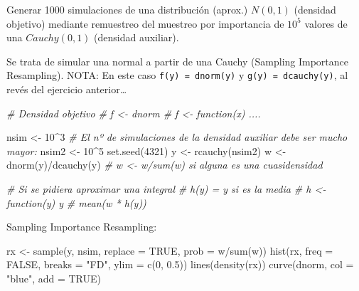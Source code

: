 \documentclass[
]{book}
\newenvironment{Shaded}{\begin{snugshade}}{\end{snugshade}}
\newcommand{\AttributeTok}[1]{\textcolor[rgb]{0.77,0.63,0.00}{#1}}
\newcommand{\CommentTok}[1]{\textcolor[rgb]{0.56,0.35,0.01}{\textit{#1}}}
\newcommand{\ConstantTok}[1]{\textcolor[rgb]{0.00,0.00,0.00}{#1}}
\newcommand{\DecValTok}[1]{\textcolor[rgb]{0.00,0.00,0.81}{#1}}
\newcommand{\FloatTok}[1]{\textcolor[rgb]{0.00,0.00,0.81}{#1}}
\newcommand{\FunctionTok}[1]{\textcolor[rgb]{0.00,0.00,0.00}{#1}}
\newcommand{\NormalTok}[1]{#1}
\newcommand{\OtherTok}[1]{\textcolor[rgb]{0.56,0.35,0.01}{#1}}
\newcommand{\SpecialCharTok}[1]{\textcolor[rgb]{0.00,0.00,0.00}{#1}}
\newcommand{\StringTok}[1]{\textcolor[rgb]{0.31,0.60,0.02}{#1}}
\theoremstyle{break}
\theoremstyle{definition}
\theoremstyle{definition}
\theoremstyle{definition}
\theoremstyle{definition}
\theoremstyle{remark}
\begin{document}
Generar 1000 simulaciones de una distribución (aprox.) \(N(0,1)\) (densidad objetivo) mediante remuestreo del muestreo por importancia de \(10^{5}\) valores de una \(Cauchy(0,1)\) (densidad auxiliar).

Se trata de simular una normal a partir de una Cauchy (Sampling Importance Resampling).
NOTA: En este caso \texttt{f(y)\ =\ dnorm(y)} y \texttt{g(y)\ =\ dcauchy(y)}, al revés del ejercicio anterior\ldots{}

\begin{Shaded}
\begin{Highlighting}[]
\CommentTok{\# Densidad objetivo}
\CommentTok{\# f \textless{}{-} dnorm \# f \textless{}{-} function(x) ....}

\NormalTok{nsim }\OtherTok{\textless{}{-}} \DecValTok{10}\SpecialCharTok{\^{}}\DecValTok{3}
\CommentTok{\# El nº de simulaciones de la densidad auxiliar debe ser mucho mayor:}
\NormalTok{nsim2 }\OtherTok{\textless{}{-}} \DecValTok{10}\SpecialCharTok{\^{}}\DecValTok{5}
\FunctionTok{set.seed}\NormalTok{(}\DecValTok{4321}\NormalTok{)}
\NormalTok{y }\OtherTok{\textless{}{-}} \FunctionTok{rcauchy}\NormalTok{(nsim2)}
\NormalTok{w }\OtherTok{\textless{}{-}} \FunctionTok{dnorm}\NormalTok{(y)}\SpecialCharTok{/}\FunctionTok{dcauchy}\NormalTok{(y) }\CommentTok{\# w \textless{}{-} w/sum(w) si alguna es una cuasidensidad}

\CommentTok{\# Si se pidiera aproximar una integral}
\CommentTok{\# h(y) = y si es la media \# h \textless{}{-} function(y) y}
\CommentTok{\# mean(w * h(y))}
\end{Highlighting}
\end{Shaded}

Sampling Importance Resampling:

\begin{Shaded}
\begin{Highlighting}[]
\NormalTok{rx }\OtherTok{\textless{}{-}} \FunctionTok{sample}\NormalTok{(y, nsim, }\AttributeTok{replace =} \ConstantTok{TRUE}\NormalTok{, }\AttributeTok{prob =}\NormalTok{ w}\SpecialCharTok{/}\FunctionTok{sum}\NormalTok{(w))}
\FunctionTok{hist}\NormalTok{(rx, }\AttributeTok{freq =} \ConstantTok{FALSE}\NormalTok{, }\AttributeTok{breaks =} \StringTok{"FD"}\NormalTok{, }\AttributeTok{ylim =} \FunctionTok{c}\NormalTok{(}\DecValTok{0}\NormalTok{, }\FloatTok{0.5}\NormalTok{))}
\FunctionTok{lines}\NormalTok{(}\FunctionTok{density}\NormalTok{(rx))}
\FunctionTok{curve}\NormalTok{(dnorm, }\AttributeTok{col =} \StringTok{"blue"}\NormalTok{, }\AttributeTok{add =} \ConstantTok{TRUE}\NormalTok{)}
\end{Highlighting}
\end{Shaded}
\end{document}

